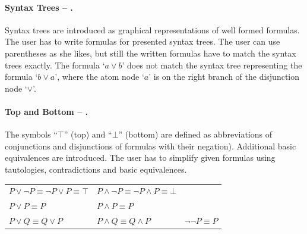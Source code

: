 \paragraph{Syntax Trees – .}
\label{tut:24}
Syntax trees  are introduced as graphical representations of well formed formulas. 
The user has to write formulas for presented syntax trees. 
The user can use parentheses as she likes, but still the written formulas have to match the syntax trees exactly. 
The formula ‘$a \vee b$’ does not match the syntax tree representing the formula ‘$b \vee a$’, 
where the atom node ‘$a$’ is on the right branch of the disjunction node ‘$\vee$’.

\paragraph{Top and Bottom – .}
\label{tut:25}
The symbols “$\top$” (top) and “$ \bot$” (bottom) are defined
as abbreviations of conjunctions and disjunctions 
of formulas with their negation). Additional basic equivalences are introduced.
The user has to simplify given formulas using tautologies, contradictions and basic equivalences.
\begin{center}
\begin{tabular}{lll}
$P \vee \neg P \equiv \neg P \vee P\equiv \top$  &
$P \wedge \neg P \equiv \neg P \wedge P \equiv  \bot$\\
$P \vee P \equiv P$ &
$P \wedge P \equiv P$\\
$P \vee Q \equiv Q \vee P$ &
$P \wedge Q \equiv Q \wedge P$ &
$\neg \neg P \equiv P$
\end{tabular}
\end{center}




%
%
%
%

